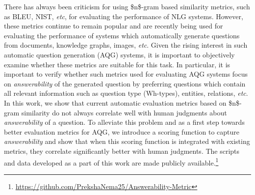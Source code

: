 There has always been criticism for using \$n\$-gram based similarity metrics, such as BLEU, NIST, \textit{etc}, for evaluating the performance of NLG systems. However, these metrics continue to remain popular and are recently being used for evaluating the performance of systems which automatically generate questions from documents, knowledge graphs, images, \textit{etc}. Given the rising interest in such automatic question generation (AQG) systems, it is important to objectively examine whether these metrics are suitable for this task. In particular, it is important to verify whether such metrics used for evaluating AQG systems focus on \textit{answerability} of the generated question by preferring questions which contain all relevant information such as question type (Wh-types), entities, relations, \textit{etc}. In this work, we show that current automatic evaluation metrics based on \$n\$-gram similarity do not always correlate well with human judgments about \textit{answerability} of a question. To alleviate this problem and as a first step towards better evaluation metrics for AQG, we introduce a scoring function to capture \textit{answerability} and show that when this scoring function is integrated with existing metrics, they correlate significantly better with human judgments. The scripts and data developed as a part of this work are made publicly available.\footnote{\url{https://github.com/PrekshaNema25/Answerability-Metric}}
